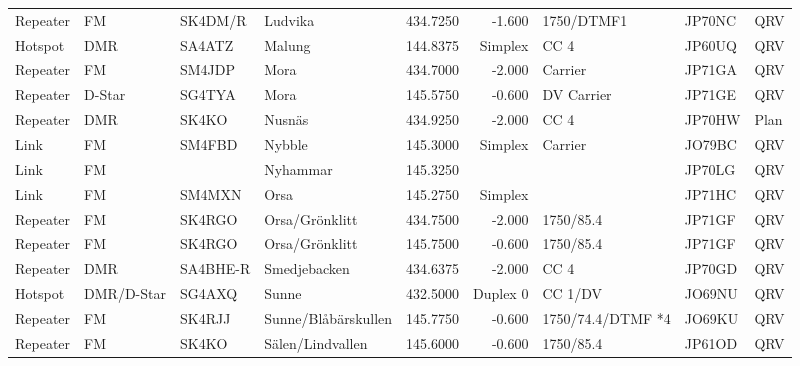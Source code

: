 \begin{landscape}
\begin{longtable}{llllrrlll}
	Repeater              & FM         & SK4DM/R  & Ludvika                &     434.7250 &     -1.600 & 1750/DTMF1        & JP70NC      & QRV      \\
	Hotspot               & DMR        & SA4ATZ   & Malung                 &     144.8375 &    Simplex & CC 4              & JP60UQ      & QRV      \\
	Repeater              & FM         & SM4JDP   & Mora                   &     434.7000 &     -2.000 & Carrier           & JP71GA      & QRV      \\
	Repeater              & D-Star     & SG4TYA   & Mora                   &     145.5750 &     -0.600 & DV Carrier        & JP71GE      & QRV      \\
	Repeater              & DMR        & SK4KO    & Nusnäs                 &     434.9250 &     -2.000 & CC 4              & JP70HW      & Plan     \\
	Link                  & FM         & SM4FBD   & Nybble                 &     145.3000 &    Simplex & Carrier           & JO79BC      & QRV      \\
	Link                  & FM         &          & Nyhammar               &     145.3250 &            &                   & JP70LG      & QRV      \\
	Link                  & FM         & SM4MXN   & Orsa                   &     145.2750 &    Simplex &                   & JP71HC      & QRV      \\
	Repeater              & FM         & SK4RGO   & Orsa/Grönklitt         &     434.7500 &     -2.000 & 1750/85.4         & JP71GF      & QRV      \\
	Repeater              & FM         & SK4RGO   & Orsa/Grönklitt         &     145.7500 &     -0.600 & 1750/85.4         & JP71GF      & QRV      \\
	Repeater              & DMR        & SA4BHE-R & Smedjebacken           &     434.6375 &     -2.000 & CC 4              & JP70GD      & QRV      \\
	Hotspot               & DMR/D-Star & SG4AXQ   & Sunne                  &     432.5000 &   Duplex 0 & CC 1/DV           & JO69NU      & QRV      \\
	Repeater              & FM         & SK4RJJ   & Sunne/Blåbärskullen    &     145.7750 &     -0.600 & 1750/74.4/DTMF *4 & JO69KU      & QRV      \\
	Repeater              & FM         & SK4KO    & Sälen/Lindvallen       &     145.6000 &     -0.600 & 1750/85.4         & JP61OD      & QRV      \\

\end{longtable}
\end{landscape}
